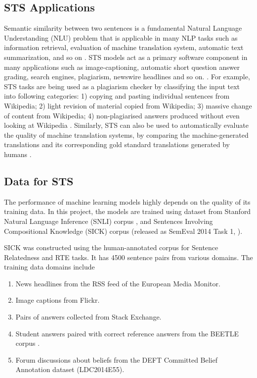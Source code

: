 \documentclass[12pt]{report} %
\begin{document}



\subsection{STS Applications}
\label{sts_app}

Semantic similarity between two sentences is a fundamental Natural Language Understanding (NLU) problem that is applicable in many NLP tasks such as information retrieval, evaluation of machine translation system, automatic text summarization, and so on \citep{agirre2016semeval}. STS models act as a primary software component in many applications such as image-captioning, automatic short question answer grading, search engines, plagiarism, newswire headlines and so on. \citep{agirre2016semeval}. For example, STS tasks are being used as a plagiarism checker by classifying the input text into following categories: 1) copying and pasting individual sentences
from Wikipedia; 2) light revision of material copied from Wikipedia; 3) massive change of content from Wikipedia; 4) non-plagiarised answers produced without even looking at Wikipedia \citep{agirre2015semeval}. Similarly, STS can also be used to automatically evaluate the quality of machine translation systems, by comparing the machine-generated translations and its corresponding gold standard translations generated by humans \citep{agirre2015semeval}. 

\subsection{Data for STS}

The performance of machine learning models highly depends on the quality of its training data. In this project, the models are trained using dataset from Stanford Natural Language Inference (SNLI) corpus  \citep{bowman2015large}, and Sentences Involving Compositional
Knowledge (SICK) corpus (released as SemEval 2014 Task 1, \citep{marelli2014semeval}).

SICK \citep{marelli2014semeval}  was constructed using the human-annotated corpus for Sentence Relatedness and RTE tasks. It has 4500 sentence pairs from various domains. The training data domains include 
\begin{enumerate}
	\item News headlines from the RSS feed of the European Media Monitor.
	\item Image captions from Flickr.
	\item Pairs of answers collected from Stack Exchange.
	\item Student answers paired with correct reference answers from the BEETLE corpus \cite{dzikovska2010intelligent}.
	\item Forum discussions about beliefs from the DEFT Committed Belief Annotation dataset (LDC2014E55).
\end{enumerate}
\end{document}
